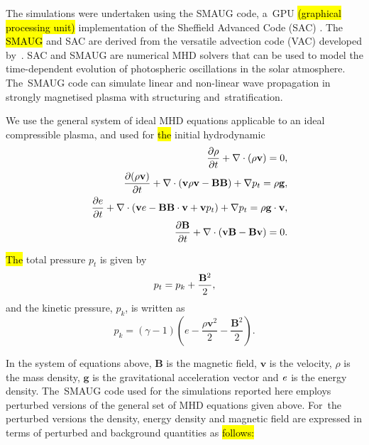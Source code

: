 \documentclass[physics,article,accept,pdftex,moreauthors]{Definitions/mdpi}
\begin{document}
The simulations were undertaken using the SMAUG code, a~GPU \hl{(graphical processing unit)} 
implementation of the Sheffield Advanced Code (SAC) \cite{Shelyag2008}. 
The %
\hl{SMAUG} %
\cite{Griffiths2015} and SAC  are derived from the versatile advection code (VAC) developed by~\cite{Toth1996}. SAC and SMAUG are numerical MHD solvers  that can be used to model the time-dependent evolution of photospheric oscillations in the solar atmosphere. The~SMAUG code can simulate linear and non-linear wave propagation in strongly magnetised plasma with structuring and~stratification.

We use the 
general system of ideal MHD equations applicable to an ideal compressible plasma, %
 and used for %
 \hl{the} 
initial hydrodynamic  %
\begin{eqnarray}
&& {{\partial \rho}\over{\partial t}}+\nabla\cdot\left( \rho{\mathbf v}\right)=0, \label{e1} \\
&& {{\partial ( \rho {\bf v})}\over{\partial t}}+\nabla\cdot\left( {\bf v}\rho {\bf v}-{\bf B B}\right)+\nabla p_t=\rho{\bf g}, \label{e2}\\
&& \frac{\partial e}{\partial t}+\nabla\cdot\left({\bf v}e-{\bf B B}\cdot{\bf v}+{\bf v}p_{t}\right)+\nabla p_t=\rho{\bf g}\cdot{\bf v}, \label{e3} \\
&& {{\partial{\bf B}}\over{\partial t}} +\nabla \cdot\left(  {\bf vB}-{\bf Bv}\right)=0. \label{e4}
\end{eqnarray}

\noindent
\hl{The } %
total pressure $p_{t}$ is given by
\begin{equation}
p_{t}=p_{k}+{{\bf B}^{2}\over{2}}, \label{e5}
\end{equation}
and the kinetic pressure, $p_k$, is written as
\begin{equation}
p_{k}=\left(\gamma -1\right)\left(e-\frac{\rho {\mathbf v}^{2}}{2}-\frac{{\mathbf B}^{2}}{2}\right). \label{e6}
\end{equation}

In the system of equations above,  $\mathbf B$ is the magnetic field, $\mathbf v$ is the velocity, $\rho$ is the mass density, $\mathbf g$ 
is the gravitational acceleration vector  %
and  
$\it{e}$ is the energy density. The~SMAUG code used for the simulations reported here employs perturbed versions of the general set of MHD equations given above. For~the perturbed versions the density,  energy density and magnetic field are expressed in terms of perturbed and background quantities as 
\hl{follows:} 
\end{document}
